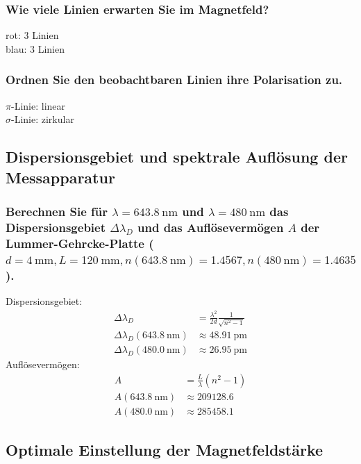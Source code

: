 \subsubsection{Wie viele Linien erwarten Sie im Magnetfeld?}
rot: 3 Linien\\\noindent
blau: 3 Linien

\subsubsection{Ordnen Sie den beobachtbaren Linien ihre Polarisation zu.}
$\pi$-Linie: linear\\\noindent
$\sigma$-Linie: zirkular


\subsection{Dispersionsgebiet und spektrale Auflösung der Messapparatur}

\subsubsection[]{Berechnen Sie für $\lambda=\SI{643.8}{\nano\metre}$ und $\lambda=\SI{480}{\nano\metre}$ das Dispersionsgebiet 
$\Delta\lambda_D$  und das Auflösevermögen $A$ der Lummer-Gehrcke-Platte ($d=\SI{4}{\milli\metre}, L=\SI{120}{\milli\metre}, 
n(\SI{643.8}{\nano\metre})=\num{1.4567}, n(\SI{480}{\nano\metre})=\num{1.4635}$).}
Dispersionsgebiet:
\begin{align*}
    \Delta\lambda_D&=\frac{\lambda^2}{2d}\frac{1}{\sqrt{n^2-1}}\\
    \Delta\lambda_D(\SI{643.8}{\nano\metre})&\approx\SI{48.91}{\pico\metre}\\
    \Delta\lambda_D(\SI{480.0}{\nano\metre})&\approx\SI{26.95}{\pico\metre}
\end{align*}
Auflösevermögen:
\begin{align*}
    A&=\frac{L}{\lambda}(n^2-1)\\
    A(\SI{643.8}{\nano\metre})&\approx\num{209128.6}\\
    A(\SI{480.0}{\nano\metre})&\approx\num{285458.1}
\end{align*}


\subsection{Optimale Einstellung der Magnetfeldstärke}

